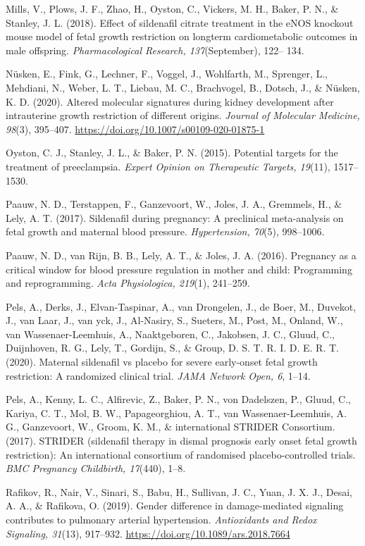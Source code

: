 \documentclass[authordate, empirical,issue]{jote-new-article}
\begin{document}
Mills, V., Plows, J. F., Zhao, H., Oyston, C., Vickers, M. H., Baker, P. N., \& Stanley, J. L. (2018). Effect of sildenafil citrate treatment in the eNOS knockout mouse model of fetal growth restriction on longterm cardiometabolic outcomes in male offspring. \emph{Pharmacological Research, 137}(September), 122–
134.

Nüsken, E., Fink, G., Lechner, F., Voggel, J., Wohlfarth, M., Sprenger, L., Mehdiani, N., Weber, L. T., Liebau, M. C., Brachvogel, B., Dotsch, J., \& Nüsken, K. D. (2020). Altered molecular signatures during kidney development after intrauterine growth restriction of different origins. \emph{Journal of Molecular Medicine, 98}(3), 395–407. \url{https://doi.org/10.1007/s00109-020-01875-1}

Oyston, C. J., Stanley, J. L., \& Baker, P. N. (2015). Potential targets for the treatment of preeclampsia. \emph{Expert Opinion on Therapeutic Targets, 19}(11), 1517–1530.

Paauw, N. D., Terstappen, F., Ganzevoort, W., Joles, J. A., Gremmels, H., \& Lely, A. T. (2017). Sildenafil during pregnancy: A preclinical meta-analysis on fetal growth and maternal blood pressure. \emph{Hypertension, 70}(5), 998–1006.

Paauw, N. D., van Rijn, B. B., Lely, A. T., \& Joles, J. A. (2016). Pregnancy as a critical window for blood pressure regulation in mother and child: Programming and reprogramming. \emph{Acta Physiologica, 219}(1), 241–259.

Pels, A., Derks, J., Elvan-Taspinar, A., van Drongelen, J., de Boer, M., Duvekot, J., van Laar, J., van yck, J., Al-Nasiry, S., Sueters, M., Post, M., Onland, W., van Wassenaer-Leemhuis, A., Naaktgeboren, C., Jakobsen, J. C., Gluud, C., Duijnhoven, R. G., Lely, T., Gordijn, S., \& Group, D. S. T. R. I. D. E. R. T. (2020). Maternal sildenafil vs placebo for severe early-onset fetal growth restriction: A randomized clinical trial. \emph{JAMA Network Open, 6}, 1–14.

Pels, A., Kenny, L. C., Alfirevic, Z., Baker, P. N., von Dadelszen, P., Gluud, C., Kariya, C. T., Mol, B. W., Papageorghiou, A. T., van Wassenaer-Leemhuis, A. G., Ganzevoort, W., Groom, K. M., \& international STRIDER Consortium. (2017). STRIDER (sildenafil therapy in dismal prognosis early onset fetal growth restriction): An international consortium of randomised placebo-controlled trials. \emph{BMC Pregnancy Childbirth, 17}(440), 1–8.

Rafikov, R., Nair, V., Sinari, S., Babu, H., Sullivan, J. C., Yuan, J. X. J., Desai, A. A., \& Rafikova, O. (2019). Gender difference in damage-mediated signaling contributes to pulmonary arterial hypertension. \emph{Antioxidants and Redox Signaling, 31}(13), 917–932. \url{https://doi.org/10.1089/ars.2018.7664}
\end{document}
